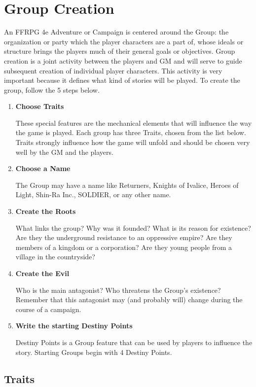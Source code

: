 \section{Group Creation}\label{sec:group}
\begin{multicols}{2}
An FFRPG 4e Adventure or Campaign is centered around the Group: the organization or party which the player characters are a part of, whose ideals or structure brings the players much of their general goals or objectives. Group creation is a joint activity between the players and GM and will serve to guide subsequent creation of individual player characters. This activity is very important because it defines what kind of stories will be played. To create the group, follow the 5 steps below.
\begin{enumerate}

\item \textbf{Choose Traits}

These special features are the mechanical elements that will influence the way the game is played. Each group has three Traits, chosen from the list below. Traits strongly influence how the game will unfold and should be chosen very well by the GM and the players.

\item \textbf{Choose a Name}

The Group may have a name like Returners, Knights of Ivalice, Heroes of Light, Shin-Ra Inc., SOLDIER, or any other name.

\item \textbf{Create the Roots}

What links the group? Why was it founded? What is its reason for existence? Are they the underground resistance to an oppressive empire? Are they members of a kingdom or a corporation? Are they young people from a village in the countryside?

\item \textbf{Create the Evil}

Who is the main antagonist? Who threatens the Group’s existence? Remember that this antagonist may (and probably will) change during the course of a campaign.

\item \textbf{Write the starting Destiny Points}

Destiny Points is a Group feature that can be used by players to influence the story. Starting Groups begin with 4 Destiny Points.
\end{enumerate}
\subsection{Traits}\label{subsec:traits}

\end{multicols}
